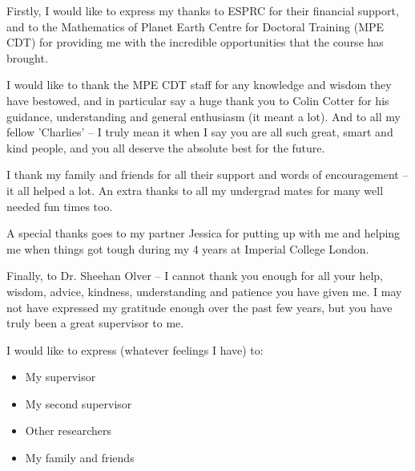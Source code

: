 
\cleardoublepage


\begin{acknowledgements}

Firstly, I would like to express my thanks to ESPRC for their financial support, and to the Mathematics of Planet Earth Centre for Doctoral Training (MPE CDT) for providing me with the incredible opportunities that the course has brought. 

I would like to thank the MPE CDT staff for any knowledge and wisdom they have bestowed, and in particular say a huge thank you to Colin Cotter for his guidance, understanding and general enthusiasm (it meant a lot). And to all my fellow 'Charlies' -- I truly mean it when I say you are all such great, smart and kind people, and you all deserve the absolute best for the future.

I thank my family and friends for all their support and words of encouragement -- it all helped a lot. An extra thanks to all my undergrad mates for many well needed fun times too.

A special thanks goes to my partner Jessica for putting up with me and helping me when things got tough during my 4 years at Imperial College London. 

Finally, to Dr. Sheehan Olver -- I cannot thank you enough for all your help, wisdom, advice, kindness, understanding and patience you have given me. I may not have expressed my gratitude enough over the past few years, but you have truly been a great supervisor to me.


I would like to express (whatever feelings I have) to:

\begin{itemize}
 \item My supervisor
 \vspace*{3mm}
 \item My second supervisor
 \vspace*{3mm}
 \item Other researchers
 \vspace*{3mm}
 \item My family and friends
\end{itemize}

\end{acknowledgements}
